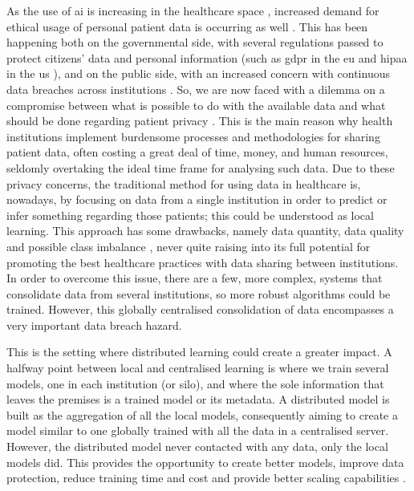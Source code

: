 As the use of \ac{ai} is increasing in the healthcare space \cite{deep_learning_increase_health}, increased demand for ethical usage of personal patient data is occurring as well \cite{ehtical_use_ml}. This has been happening both on the governmental side, with several regulations passed to protect citizens' data and personal information (such as \ac{gdpr} in the \ac{eu} \cite{gdpr_article} and \ac{hipaa} in the \ac{us} \cite{hippa}), and on the public side, with an increased concern with continuous data breaches across institutions \cite{abdulrahmanSurveyFederatedLearning2021}. So,  we are now faced with a dilemma on a compromise between what is possible to do with the available data and what should be done regarding patient privacy \cite{swarm_learning}. This is the main reason why health institutions implement burdensome processes and methodologies for sharing patient data, often costing a great deal of time, money, and human resources, seldomly overtaking the ideal time frame for analysing such data.
Due to these privacy concerns, the traditional method for using data in healthcare is, nowadays, by focusing on data from a single institution in order to predict or infer something regarding those patients; this could be understood as local learning. This approach has some drawbacks, namely data quantity, data quality and possible class imbalance \cite{rajkomarMachineLearningMedicine2019}, never quite raising into its full potential for promoting the best healthcare practices
\cite{federated_healthcare_informatics,usage_ai_healthcare,wangAIHealthState2019} with data sharing between institutions.
In order to overcome this issue, there are a few, more complex, systems that consolidate data from several institutions, so more robust algorithms could be trained. However, this globally centralised consolidation of data encompasses a very important data breach hazard. 

This is the setting where distributed learning could create a greater impact. A halfway point between local and centralised learning is where we train several models, one in each institution (or silo), and where the sole information that leaves the premises is a trained model or its metadata. A distributed model is built as the aggregation of all the local models, consequently aiming to create a model similar to one globally trained with all the data in a centralised server. However, the distributed model never contacted with any data, only the local models did. This provides the opportunity to create better models, improve data protection, reduce training time and cost and provide better scaling capabilities  \cite{jatainContemplativePerspectiveFederated2021}.

